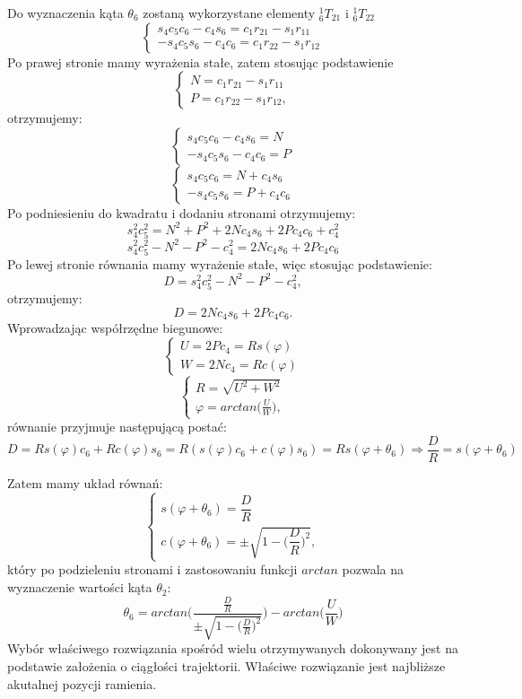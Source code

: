 \documentclass{article}
\begin{document}
Do wyznaczenia kąta $\theta_6$ zostaną wykorzystane elementy $_6^1T_{21}$ i $_6^1T_{22}$
\[
\begin{cases}
s_4c_5c_6-c_4s_6=c_1r_{21}-s_1r_{11}\\
-s_4c_5s_6-c_4c_6=c_1r_{22}-s_1r_{12}
\end{cases}
\]
Po prawej stronie mamy wyrażenia stałe, zatem stosując podstawienie
\[
\begin{cases}
N=c_1r_{21}-s_1r_{11}\\
P=c_1r_{22}-s_1r_{12},
\end{cases}
\]
otrzymujemy:
\[
\begin{cases}
s_4c_5c_6-c_4s_6=N\\
-s_4c_5s_6-c_4c_6=P
\end{cases}
\]
\[
\begin{cases}
s_4c_5c_6=N+c_4s_6\\
-s_4c_5s_6=P+c_4c_6
\end{cases}
\]
Po podniesieniu do kwadratu i dodaniu stronami otrzymujemy:
\[
s_4^2c_5^2=N^2+P^2+2Nc_4s_6+2Pc_4c_6+c_4^2
\]
\[
s_4^2c_5^2-N^2-P^2-c_4^2=2Nc_4s_6+2Pc_4c_6
\]
Po lewej stronie równania mamy wyrażenie stałe, więc stosując podstawienie:
\[
D=s_4^2c_5^2-N^2-P^2-c_4^2,
\]
otrzymujemy:
\[
D=2Nc_4s_6+2Pc_4c_6 .
\]
Wprowadzając współrzędne biegunowe:
\[
\begin{cases}
U=2Pc_4=Rs(\varphi)\\
W=2Nc_4=Rc(\varphi)
\end{cases}
\]
\[
\begin{cases}
R=\sqrt{U^2+W^2} \\
\varphi = arctan \Big(\frac{U}{W}\Big) ,
\end{cases}
\]
równanie przyjmuje następującą postać:
\[
D=Rs(\varphi)c_6 + Rc(\varphi)s_6 = R(s(\varphi)c_6 + c(\varphi)s_6) = Rs(\varphi+\theta_6) \Rightarrow \dfrac{D}{R}=s(\varphi+\theta_6) 
\]

Zatem mamy układ równań:
\[
\begin{cases}
s(\varphi+\theta_6) =\dfrac{D}{R}\\
c(\varphi+\theta_6)= \pm \sqrt{1-\Big(\dfrac{D}{R}\Big)^2} ,
\end{cases}
\]
który po podzieleniu stronami i zastosowaniu funkcji $arctan$ pozwala na wyznaczenie warto\'sci kąta $\theta_2$:
\[
\theta_6 = arctan \Bigg( \dfrac{\frac{D}{R}}{\pm \sqrt{1-\Big(\frac{D}{R}\Big)^2}}\Bigg) - arctan \Big(\frac{U}{W}\Big)
\]
Wybór wła\'sciwego rozwiązania spo\'sród wielu otrzymywanych dokonywany jest na podstawie założenia o ciągło\'sci trajektorii. Wła\'sciwe rozwiązanie jest najbliższe akutalnej pozycji ramienia.
\end{document}
